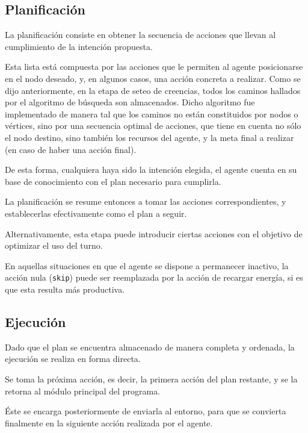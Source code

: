 \subsection{Planificación}
\label{sec:planificacion}



La planificación consiste en obtener la secuencia de acciones que
llevan al cumplimiento de la intención propuesta. 

Esta lista está
compuesta por las acciones que le permiten al agente posicionarse en
el nodo deseado, y, en algunos casos, una acción concreta a realizar.
Como se dijo anteriormente, en la etapa de seteo de creencias, todos
los caminos hallados por el algoritmo de búsqueda son almacenados.
Dicho algoritmo fue implementado de manera tal que los caminos no
están constituidos por nodos o vértices, sino por una secuencia
optimal de acciones, que tiene en cuenta no sólo el nodo destino, sino
también los recursos del agente, y la meta final a realizar (en caso
de haber una acción final). 

De esta forma, cualquiera haya sido la
intención elegida, el agente cuenta en su base de conocimiento con el
plan necesario para cumplirla. 

La planificación se resume entonces a
tomar las acciones correspondientes, y establecerlas efectivamente
como el plan a seguir.



Alternativamente, esta etapa puede introducir ciertas acciones con el
objetivo de optimizar el uso del turno. 

En aquellas situaciones en
que el agente se dispone a permanecer inactivo, la acción nula
(\texttt{skip}) puede ser reemplazada por la acción de recargar
energía, si es que esta resulta más productiva.



\subsection{Ejecución}
\label{sec:ejecucion}



Dado que el plan se encuentra almacenado de manera completa y
ordenada, la ejecución se realiza en forma directa. 

Se toma la
próxima acción, es decir, la primera acción del plan restante, y se
la retorna al módulo principal del programa. 

Éste se encarga
posteriormente de enviarla al entorno, para que se convierta
finalmente en la siguiente acción realizada por el agente.



